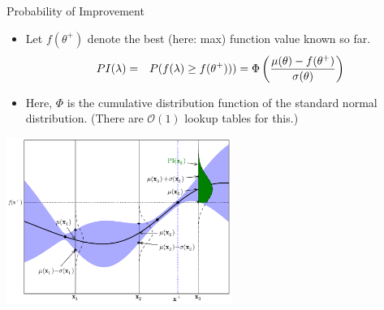 \begin{frame}[c,fragile]{Probability of Improvement}
\begin{itemize}
\vspace*{-0.2cm}
  \item Let $f(\theta^+)$ denote the best (here: max) function value known so far.
\vspace*{-0.2cm}  
  \begin{eqnarray}
\nonumber{}  PI(\mathbf{\lambda}) & = & P(f(\mathbf{\lambda}) \ge f(\theta^+))) = \Phi \left( \frac{\mu(\theta) - f(\theta^+)}{\sigma(\theta)} \right)
  \end{eqnarray}
  \item Here, $\Phi$ is the cumulative distribution function of the standard normal distribution. (There are $\mathcal{O}(1)$ lookup tables for this.)
\end{itemize}
\centering
\includegraphics[width=0.55\textwidth]{images/Acquisition-PI.png} 

\end{frame}

